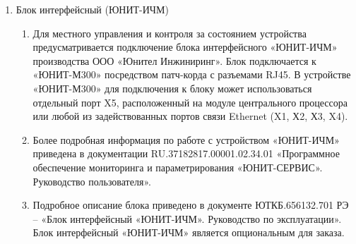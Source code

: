 \begin{enumerate}[label=\arabic{section}.\arabic{subsection}.\arabic*, labelsep=4pt, leftmargin=0pt, itemindent=57pt]
\begin{enumerate}[label=\arabic{section}.\arabic{subsection}.\arabic{enumi}.\arabic*, labelsep=4pt, leftmargin=0em, itemindent=65pt, parsep=0pt]
\noindent
\fboxrule=1.2pt %
\noindent
{}\vskip 2mm

\end{enumerate}

\item\label{sec1:hmi} Блок интерфейсный (ЮНИТ-ИЧМ)

\begin{enumerate}[label=\arabic{section}.\arabic{subsection}.\arabic{enumi}.\arabic*, labelsep=4pt, leftmargin=0em, itemindent=65pt, parsep=0pt]

\item
Для местного управления и контроля за состоянием устройства предусматривается подключение блока интерфейсного «ЮНИТ-ИЧМ» производства ООО «Юнител Инжиниринг». Блок подключается к «ЮНИТ-М300» посредством патч-корда с разъемами RJ45. В устройстве «ЮНИТ-М300» для подключения к блоку может использоваться отдельный порт X5, расположенный на модуле центрального процессора или любой из задействованных портов связи Ethernet (X1, Х2, Х3, X4).
\item
Более подробная информация по работе с устройством «ЮНИТ-ИЧМ» приведена в документации RU.37182817.00001.02.34.01 «Программное обеспечение мониторинга и параметрирования «ЮНИТ-СЕРВИС». Руководство пользователя».

\item
Подробное описание блока приведено в документе ЮТКБ.656132.701 РЭ – «Блок интерфейсный «ЮНИТ-ИЧМ». Руководство по эксплуатации». Блок интерфейсный «ЮНИТ-ИЧМ» является опциональным для заказа.

\end{enumerate}

\end{enumerate}


